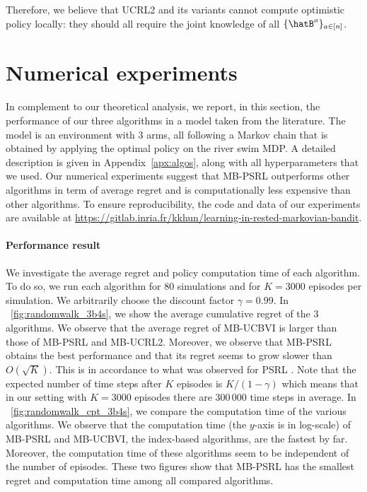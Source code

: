 Therefore, we  believe that UCRL2 and its variants cannot compute optimistic  policy locally: they should all require the joint knowledge of all $\{\hatB^a\}_{a\in[n]}$.


\section{Numerical experiments}
\label{sec:numerical}

In complement to our theoretical analysis, we report, in this section, the performance of our three algorithms in a model taken from the literature. %
The model is an environment with 3 arms, all following a Markov chain that is obtained by applying the optimal policy on the river swim MDP. A detailed description is given in Appendix~\ref{apx:algos}, along with all hyperparameters that we used. Our numerical experiments suggest that MB-PSRL outperforms other algorithms in term of average regret and is computationally less expensive than other algorithms. To ensure reproducibility, the code and data of our experiments are available at \url{https://gitlab.inria.fr/kkhun/learning-in-rested-markovian-bandit}.

\paragraph{Performance result}
We investigate the average regret and policy computation time of each algorithm.
To do so, we run each algorithm for $80$ simulations and for $K=3000$ episodes per simulation. We arbitrarily choose the discount factor $\gamma=0.99$. In \figurename~\ref{fig:randomwalk_3b4s}, we show the average cumulative regret of the 3 algorithms. We observe that the average regret of MB-UCBVI is larger than those of MB-PSRL and MB-UCRL2.
Moreover, we observe that MB-PSRL obtains the best performance and that its regret seems to grow slower than $O(\sqrt{K})$. This is in accordance to what was observed for PSRL \cite{osband2013more}. 
Note that the expected number of time steps after $K$ episodes is $K/(1-\gamma)$ which means that in our setting with $K=3000$ episodes there are $300\,000$ time steps in average. 
In \figurename~\ref{fig:randomwalk_cpt_3b4s}, we compare the computation time of the various algorithms. We observe that the computation time (the $y$-axis is in log-scale) of MB-PSRL and MB-UCBVI, the index-based algorithms, are the fastest by far. 
Moreover, the computation time of these algorithms seem to be independent of the number of episodes. 
These two figures show that MB-PSRL has the smallest regret and computation time among all compared algorithms.

